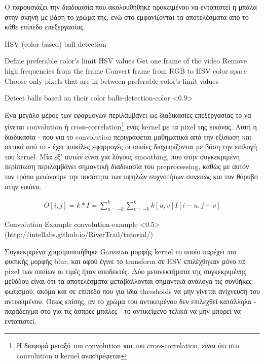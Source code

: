 Ο  παρουσιάζει την διαδικασία που ακολουθήθηκε προκειμένου να ε\-ντο\-πι\-στεί η μπάλα στην σκηνή με βάση το χρώμα της, ενώ στο  εμφανίζονται τα αποτελέσματα από το κάθε επίπεδο επεξεργασίας.

\begin{algorithm}[H]
	\caption[HSV (color based) ball detection]{HSV (color based) ball detection}\label{alg:hsv-detect}
	\begin{algorithmic}[1]
            \State Define preferable color's limit HSV values
            \State Get one frame of the video
            \State Remove high frequencies from the frame
            \State Convert frame from RGB to HSV color space
            \State Choose only pixels that are in between preferable color's limit values 
	\end{algorithmic}
\end{algorithm}

%
{Detect balls based on their color}%
{balls-detection-color}%
<0.9>

Ένα μεγάλο μέρος των  εφαρμογών περιλαμβάνει ως διαδικασίες επεξεργασίας το να γίνεται convolution ή cross-correlation\footnote{Η διαφορά μεταξύ του convolution και του cross-correlation, είναι ότι στο convolution ο kernel αναστρέφεται} ενός kernel με τα pixel της εικόνας. Αυτή η διαδικασία - που για το convolution περιγράφεται μαθηματικά από την εξίσωση  και οπτικά από το  - έχει ποικίλες εφαρμογές οι οποίες διαχωρίζονται με βάση την επιλογή του kernel. Μία εξ' αυτών είναι για λόγους smoothing, που στην συγκεκριμένη περίπτωση περιλαμβάνει σημαντική διαδικασία του preprocessing, καθώς με αυτόν τον τρόπο μειώνουμε την ποσότητα των υψηλών συχνοτήτων συνεπώς και τον θόρυβο στην εικόνα.

\begin{gather}
	O[i,j] = k * I = \sum_{u=-k}^{k} \sum_{v=-k}^{k} k[u,v]I[i-u,j-v] \label{eq:cross-correlation}
\end{gather}

%
{Convolution Example}%
{convolution-example}%
<0.5>%
(http://intellabs.github.io/RiverTrail/tutorial/)

Συγκεκριμένα χρησιμοποιήθηκε Gaussian μορφής kernel το οποίο παρέχει πιο φυσικής μορφής blur, και αφού έγινε το transform σε HSV επιλέχθηκαν μόνο τα pixel των οποίων οι τιμές ήταν αποδεκτές. Δύο μειονεκτήματα της συγκεκριμένης μεθόδου είναι ότι τα αποτελέσματα μεταβάλλονται σημαντικά ανάλογα τις συνθήκες φωτισμού, ακόμα και σε επίπεδο που για ίδια thresholds να μην γίνεται ανίχνευση του αντικειμένου. Όπως επίσης, αν το χρώμα του αντικειμένου δεν επιλεχθεί κατάλληλα - παράδειγμα στο  για τις άσπρες μπάλες - το αντικείμενο τελικά να μην μπορεί να εντοπιστεί. 


